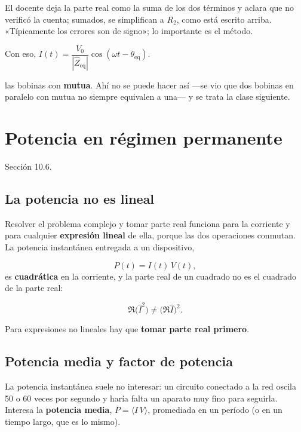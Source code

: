 \documentclass[12pt,a4paper]{article}
\begin{document}
\begin{notebox}
El docente deja la parte real como la suma de los dos términos y aclara que
no verificó la cuenta; sumados, se simplifican a $R_2$, como está escrito
arriba. «Típicamente los errores son de signo»; lo importante es el método.
\end{notebox}

Con eso, $I(t) = \dfrac{V_0}{|{\hat Z}_{\text{eq}}|}\cos(\omega t - \theta_{\text{eq}})$.

\begin{notebox}
las bobinas con \textbf{mutua}. Ahí no se puede
hacer así ---se vio que dos bobinas en paralelo con mutua no siempre equivalen
a una--- y se trata la clase siguiente.
\end{notebox}

\section{Potencia en régimen permanente}

Sección 10.6.

\subsection{La potencia no es lineal}

Resolver el problema complejo y tomar parte real funciona para la corriente y
para cualquier \textbf{expresión lineal} de ella, porque las dos operaciones
conmutan. La potencia instantánea entregada a un dispositivo,

\[
P(t) = I(t)\,V(t),
\]
es \textbf{cuadrática} en la corriente, y la parte real de un cuadrado no es el
cuadrado de la parte real:

\[
\Re\big(\hat I^2\big) \neq \big(\Re\hat I\big)^2 .
\]

\begin{warnbox}
Para expresiones no lineales hay que \textbf{tomar parte real primero}.
\end{warnbox}

\subsection{Potencia media y factor de potencia}

La potencia instantánea suele no interesar: un circuito conectado a la red
oscila 50 o 60 veces por segundo y haría falta un aparato muy fino para
seguirla. Interesa la \textbf{potencia media}, $\overline{P} = \langle I\,V\rangle$,
promediada en un período (o en un tiempo largo, que es lo mismo).
\end{document}
